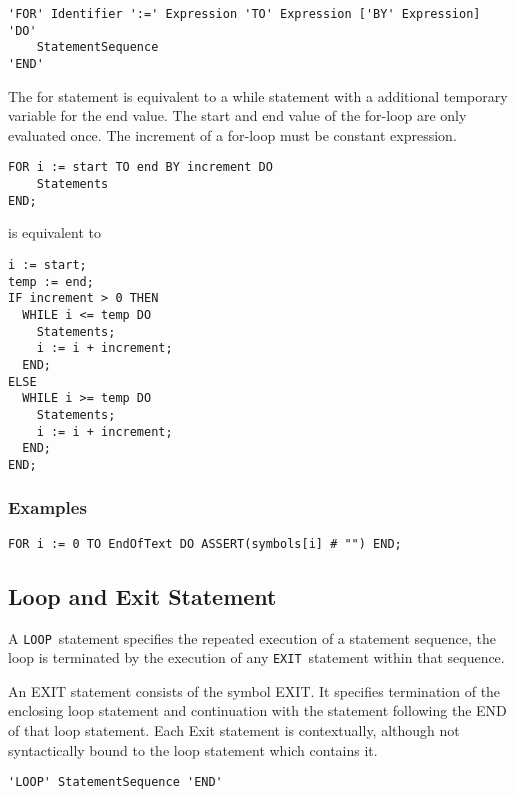 \documentclass[a4wide,11pt]{article}
\newcommand{\LOOP}{\lstinline"LOOP"}
\newcommand{\EXIT}{\lstinline"EXIT"}
\begin{document}
\begin{lstlisting}[style=ebnf]
'FOR' Identifier ':=' Expression 'TO' Expression ['BY' Expression] 'DO'
    StatementSequence
'END'
\end{lstlisting}

The for statement is equivalent to a while statement with a additional temporary variable for the end value.
The start and end value of the for-loop are only evaluated once.
The increment of a for-loop must be constant expression.

\begin{lstlisting}[style=example]
FOR i := start TO end BY increment DO
	Statements
END;
\end{lstlisting}
is equivalent to
\begin{lstlisting}[style=example]
i := start;
temp := end;
IF increment > 0 THEN
  WHILE i <= temp DO
    Statements;
    i := i + increment;
  END;
ELSE
  WHILE i >= temp DO
    Statements;
    i := i + increment;
  END;
END;
\end{lstlisting}

\begin{annotation}
\subsubsection{Examples}
\begin{lstlisting}[style=example]
FOR i := 0 TO EndOfText DO ASSERT(symbols[i] # "") END;
\end{lstlisting}
\end{annotation}

\subsection{Loop and Exit Statement}
A \LOOP\ statement specifies the repeated execution of a statement sequence, the loop is terminated by the execution of any \EXIT\ statement within that sequence.



An EXIT statement consists of the symbol EXIT.
It specifies termination of the enclosing loop statement and continuation with the statement following the END of that loop statement.
Each Exit statement is contextually, although not syntactically bound to the loop statement which contains it.

\begin{lstlisting}[style=ebnf]
'LOOP' StatementSequence 'END'
\end{lstlisting}
\end{document}
